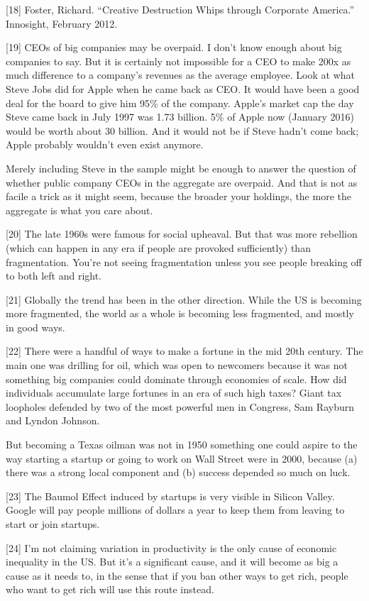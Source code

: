 {[}18{]} Foster, Richard. ``Creative Destruction Whips through Corporate
America.'' Innosight, February 2012.

{[}19{]} CEOs of big companies may be overpaid. I don't know enough
about big companies to say. But it is certainly not impossible for a CEO
to make 200x as much difference to a company's revenues as the average
employee. Look at what Steve Jobs did for Apple when he came back as
CEO. It would have been a good deal for the board to give him 95\% of
the company. Apple's market cap the day Steve came back in July 1997 was
1.73 billion. 5\% of Apple now (January 2016) would be worth about 30
billion. And it would not be if Steve hadn't come back; Apple probably
wouldn't even exist anymore.

Merely including Steve in the sample might be enough to answer the
question of whether public company CEOs in the aggregate are overpaid.
And that is not as facile a trick as it might seem, because the broader
your holdings, the more the aggregate is what you care about.

{[}20{]} The late 1960s were famous for social upheaval. But that was
more rebellion (which can happen in any era if people are provoked
sufficiently) than fragmentation. You're not seeing fragmentation unless
you see people breaking off to both left and right.

{[}21{]} Globally the trend has been in the other direction. While the
US is becoming more fragmented, the world as a whole is becoming less
fragmented, and mostly in good ways.

{[}22{]} There were a handful of ways to make a fortune in the mid 20th
century. The main one was drilling for oil, which was open to newcomers
because it was not something big companies could dominate through
economies of scale. How did individuals accumulate large fortunes in an
era of such high taxes? Giant tax loopholes defended by two of the most
powerful men in Congress, Sam Rayburn and Lyndon Johnson.

But becoming a Texas oilman was not in 1950 something one could aspire
to the way starting a startup or going to work on Wall Street were in
2000, because (a) there was a strong local component and (b) success
depended so much on luck.

{[}23{]} The Baumol Effect induced by startups is very visible in
Silicon Valley. Google will pay people millions of dollars a year to
keep them from leaving to start or join startups.

{[}24{]} I'm not claiming variation in productivity is the only cause of
economic inequality in the US. But it's a significant cause, and it will
become as big a cause as it needs to, in the sense that if you ban other
ways to get rich, people who want to get rich will use this route
instead.

